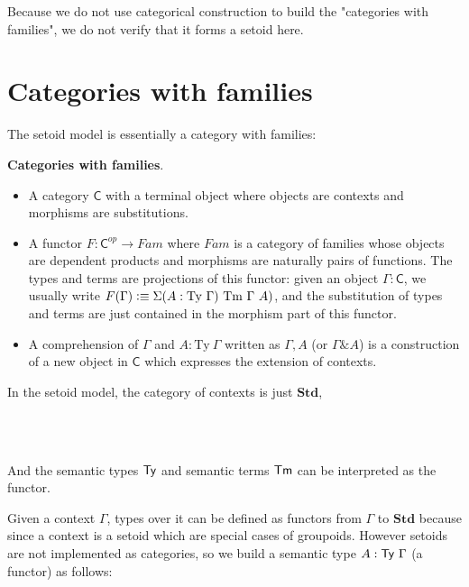 Because we do not use categorical construction to build the "categories with families", we do not verify that it forms a setoid here. 

\section{Categories with families}

The setoid model is essentially a category with families:

\begin{definition}\label{cwf:def}
\textbf{Categories with families}.

\begin{itemize}
\item A category $\mathsf{C}$ with a terminal object where objects are contexts and morphisms are substitutions.

\item A functor $F : \mathsf{C}^{op} \to Fam$ where $Fam$ is a category of families whose objects are dependent products and morphisms are naturally pairs of functions. The types and terms are projections of this functor: given an object $\Gamma : \mathsf{C}$, we usually write $F(\Gamma) \vcentcolon\equiv \Sigma(A : \text{Ty} ~\Gamma) ~ \text{Tm} ~\Gamma ~ A)$, and the substitution of types and terms are just contained in the morphism part of this functor. 

\item A comprehension of $\Gamma$ and $A : \text{Ty}~ \Gamma$ written as $\Gamma, A$ (or  $\Gamma \& A$) is a construction of a new object in $\mathsf{C}$ which expresses the extension of contexts.
\end{itemize}

\end{definition}

In the setoid model, the category of contexts is just $\textbf{Std}$,

\begin{code}
%
\\
\> \AgdaSymbol{=} \<%
\\
\end{code}

And the semantic types $\mathsf{Ty}$ and semantic terms $\mathsf{Tm}$ can be interpreted as the functor.

Given a context $\Gamma$, types over it can be defined as functors from $\Gamma$ to $\textbf{Std}$ because since a context is a setoid which are special cases of groupoids. However setoids are not implemented as categories, so we build a semantic type $A : \mathsf{Ty} ~\Gamma$ (a functor) as follows:


